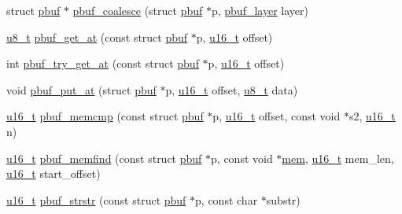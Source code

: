 \begin{DoxyCompactItemize}
struct \hyperlink{structpbuf}{pbuf} $\ast$ \hyperlink{group__pbuf_ga031469589fa95ece3bf1c136d1509eac}{pbuf\+\_\+coalesce} (struct \hyperlink{structpbuf}{pbuf} $\ast$p, \hyperlink{group__pbuf_gaee1baa59bb2f85ba575b5a8619ac1ebf}{pbuf\+\_\+layer} layer)
\item 
\hyperlink{group__compiler__abstraction_ga4caecabca98b43919dd11be1c0d4cd8e}{u8\+\_\+t} \hyperlink{group__pbuf_ga6d803d9945bffb7ad97743f2fa503da6}{pbuf\+\_\+get\+\_\+at} (const struct \hyperlink{structpbuf}{pbuf} $\ast$p, \hyperlink{group__compiler__abstraction_ga77570ac4fcab86864fa1916e55676da2}{u16\+\_\+t} offset)
\item 
int \hyperlink{group__pbuf_ga839f342803b0cf89049744124c5a98ad}{pbuf\+\_\+try\+\_\+get\+\_\+at} (const struct \hyperlink{structpbuf}{pbuf} $\ast$p, \hyperlink{group__compiler__abstraction_ga77570ac4fcab86864fa1916e55676da2}{u16\+\_\+t} offset)
\item 
void \hyperlink{group__pbuf_gaf76863707dc02993eae116574b1ea03f}{pbuf\+\_\+put\+\_\+at} (struct \hyperlink{structpbuf}{pbuf} $\ast$p, \hyperlink{group__compiler__abstraction_ga77570ac4fcab86864fa1916e55676da2}{u16\+\_\+t} offset, \hyperlink{group__compiler__abstraction_ga4caecabca98b43919dd11be1c0d4cd8e}{u8\+\_\+t} data)
\item 
\hyperlink{group__compiler__abstraction_ga77570ac4fcab86864fa1916e55676da2}{u16\+\_\+t} \hyperlink{group__pbuf_ga2170ccbbb13238380dbb203ee1b85974}{pbuf\+\_\+memcmp} (const struct \hyperlink{structpbuf}{pbuf} $\ast$p, \hyperlink{group__compiler__abstraction_ga77570ac4fcab86864fa1916e55676da2}{u16\+\_\+t} offset, const void $\ast$s2, \hyperlink{group__compiler__abstraction_ga77570ac4fcab86864fa1916e55676da2}{u16\+\_\+t} n)
\item 
\hyperlink{group__compiler__abstraction_ga77570ac4fcab86864fa1916e55676da2}{u16\+\_\+t} \hyperlink{group__pbuf_ga18c164a6e4a24d89ea9eb7571a886448}{pbuf\+\_\+memfind} (const struct \hyperlink{structpbuf}{pbuf} $\ast$p, const void $\ast$\hyperlink{structmem}{mem}, \hyperlink{group__compiler__abstraction_ga77570ac4fcab86864fa1916e55676da2}{u16\+\_\+t} mem\+\_\+len, \hyperlink{group__compiler__abstraction_ga77570ac4fcab86864fa1916e55676da2}{u16\+\_\+t} start\+\_\+offset)
\item 
\hyperlink{group__compiler__abstraction_ga77570ac4fcab86864fa1916e55676da2}{u16\+\_\+t} \hyperlink{openmote-cc2538_2lwip_2src_2include_2lwip_2pbuf_8h_a9ba3f7b705309ceadb147692fd5a1c7d}{pbuf\+\_\+strstr} (const struct \hyperlink{structpbuf}{pbuf} $\ast$p, const char $\ast$substr)
\end{DoxyCompactItemize}


